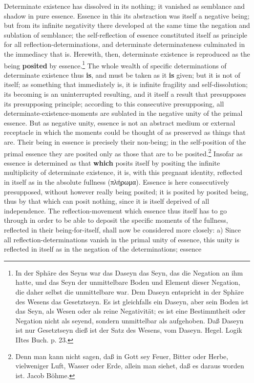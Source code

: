 \documentclass[12pt,a4paper,openany]{book}
\newcommand{\opage}[1]{\marginnote{\footnotesize\textit{[#1]}}}
\begin{document}
Determinate existence has dissolved in its nothing; it vanished as semblance and shadow in pure essence. Essence in this its abstraction was itself a negative being;
\setcounter{footnote}{0}%
\opage{114}but from its infinite negativity there developed at the same time the negation and sublation of semblance; the self-reflection of essence constituted itself as principle for all reflection-determinations, and determinate determinateness culminated in the immediacy that is. Herewith, then, determinate existence is reproduced as the being \textbf{posited} by essence.\footnote{In der Sphäre des Seyns war das Daseyn das Seyn, das die Negation an ihm hatte, und das Seyn der unmittelbare Boden und Element dieser Negation, die daher selbst die unmittelbare war. Dem Daseyn entspricht in der Sphäre des Wesens das Gesetztseyn. Es ist gleichfalls ein Daseyn, aber sein Boden ist das Seyn, als Wesen oder als reine Negativität; es ist eine Bestimmtheit oder Negation nicht als seyend, sondern unmittelbar als aufgehoben. Daß Daseyn ist nur Gesetztseyn dieß ist der Satz des Wesens, vom Daseyn. Hegel. Logik IItes Buch. p. 23.}
The whole wealth of specific determinations of determinate existence thus \textbf{is}, and must be taken as it \textbf{is} given; but it is not of itself; as something that immediately is, it is infinite fragility and self-dissolution; its becoming is an uninterrupted resulting, and it itself a result that presupposes its presupposing principle; according to this consecutive presupposing, all determinate-existence-moments are sublated in the negative unity of the primal essence. But as negative unity, essence is not an abstract medium or external receptacle in which the moments could be thought of as preserved as things that are. Their being in essence is precisely their non-being; in the self-position of the primal essence they are posited only as those that are to be posited.\footnote{Denn man kann nicht sagen, daß in Gott sey Feuer, Bitter oder Herbe, vielweniger Luft, Wasser oder Erde, allein man siehet, daß es daraus worden ist. Jacob Böhme.} Insofar as
\setcounter{footnote}{0}%
\opage{115}essence is determined as that \textbf{which} posits itself by positing the infinite multiplicity of determinate existence, it is, with this pregnant identity, reflected in itself as in the absolute fullness
(πλήρωμα). Essence is here consecutively presupposed, without however really being posited; it is posited by posited being, thus by that which can posit nothing, since it is itself deprived of all independence. The reflection-movement which essence thus itself has to go through in order to be able to deposit the specific moments of the fullness, reflected in their being-for-itself, shall now be considered more closely: a) Since all reflection-determinations vanish in the primal unity of essence, this unity is reflected in itself as in the negation of the determinations; essence
\end{document}
